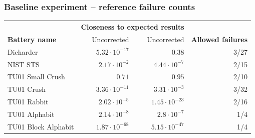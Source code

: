 \documentclass[aspectratio=169]{beamer}
\newcommand{\gr}{\cellcolor{green!40}}
\begin{document}
\begin{frame}
\frametitle{Baseline experiment -- reference failure counts}
\begin{table}
\begin{nomar}
\centering
\begin{tabular}{@{}lrrr@{}}
                                                                                                                  \toprule
                      & \multicolumn{2}{c}{\textbf{Closeness to expected results}} &                           \\ \cmidrule(lr){2-3}
\textbf{Battery name} & Uncorrected               & Uncorrected                    & \textbf{Allowed failures} \\ \midrule
Dieharder             &    $5.32 \cdot 10^{-17}$  & \gr$0.38$                      & 3/27                      \\ 
NIST STS              & \gr$2.17 \cdot 10^{-2}$   &    $4.44 \cdot 10^{-7}$        & 2/15                      \\ 
TU01 Small Crush      &    $0.71$                 & \gr$0.95$                      & 2/10                      \\ 
TU01 Crush            &    $3.36 \cdot 10^{-11}$  & \gr$3.31 \cdot 10^{-3}$        & 3/32                      \\ 
TU01 Rabbit           & \gr$2.02 \cdot 10^{-5}$   &    $1.45 \cdot 10^{-23}$       & 2/16                      \\ 
TU01 Alphabit         &    $2.14 \cdot 10^{-8}$   & \gr$2.8 \cdot 10^{-7}$         & 1/4                       \\ 
TU01 Block Alphabit   &    $1.87 \cdot 10^{-68}$  & \gr$5.15 \cdot 10^{-47}$       & 1/4                       \\ \bottomrule
\end{tabular}
\end{nomar}
\end{table}
\end{frame}
\end{document}
